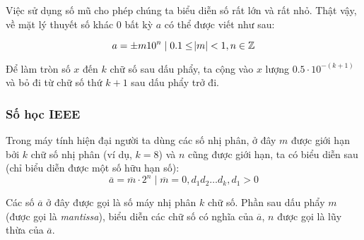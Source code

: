 \documentclass[../../Lectures.tex]{subfiles}
\begin{document}
Việc sử dụng số mũ cho phép chúng ta biểu diễn số rất lớn và rất nhỏ. Thật vậy,
về mặt lý thuyết số khác 0 bất kỳ \(a\) có thể được viết như sau:

\[a = \pm m 10^n \mid 0.1 \leq \abs{m} < 1, n \in \mathbb{Z}\]

\begin{rule_of_thumb}
    Để làm tròn số \(x\) đến \(k\) chữ số sau dấu phẩy, ta cộng vào \(x\) lượng
    \(\num{0.5} \cdot 10^{-(k+1)}\) và bỏ đi từ chữ số thứ \(k+1\) sau dấu phẩy
    trở đi.
\end{rule_of_thumb}

\subsubsection{Số học IEEE}

Trong máy tính hiện đại người ta dùng các số nhị phân, ở đây \(m\) được giới hạn
bởi \(k\) chữ số nhị phân (ví dụ, \(k = 8\)) và \(n\) cũng được giới hạn, ta có
biểu diễn sau (chỉ biểu diễn được một số hữu hạn số):
\begin{equation}
    \overline{a} = \overline{m} \cdot 2^n \mid \overline{m} = 0,d_1d_2\ldots d_k, d_1 > 0
\end{equation}

Các số \(\overline{a}\) ở đây được gọi là số máy nhị phân \(k\) chữ số. Phần sau
dấu phẩy \(m\) (được gọi là \emph{mantissa}), biểu diễn các chữ số có nghĩa của
\(\overline{a}\), \(n\) được gọi là lũy thừa của \(\overline{a}\).
\end{document}
